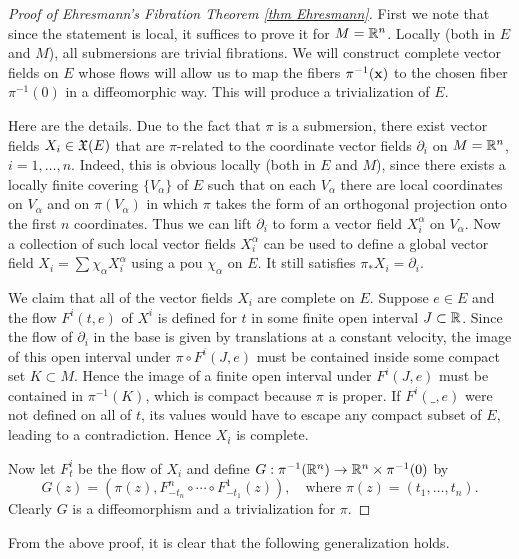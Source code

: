 \begin{proof}[Proof of Ehresmann's Fibration Theorem \ref{thm Ehresmann}]\label{proof of Ehresmann thm}
    First we note that since the statement is local, it suffices to prove it for $M=\bbR^n$. Locally (both in $E$ and $M$), all submersions are trivial fibrations. We will construct complete vector fields on $E$ whose flows will allow us to map the fibers $\pi^{-1}(\bf{x})$ to the chosen fiber $\pi^{-1}(0)$ in a diffeomorphic way. This will produce a  trivialization of $E$.
    
    Here are the details. Due to the fact that $\pi$ is a submersion, there exist vector fields $X_i\in\fX(E)$ that are $\pi$-related to the coordinate vector fields $\partial_i$ on $M=\bbR^n$, $i=1,\ldots,n$. Indeed, this is obvious locally (both in $E$ and $M$), since there exists a locally finite covering $\{V_\alpha\}$ of $E$ such that on each $V_\alpha$ there are local coordinates on $V_\alpha$ and on $\pi(V_\alpha)$ in which $\pi$ takes the form of an orthogonal projection onto the first $n$ coordinates. Thus we can lift $\partial_i$ to form a vector field $X^\alpha_i$ on $V_\alpha$. Now a collection of such local vector fields $X_i^\alpha$ can be used to define a global vector field $X_i=\sum\chi_\alpha X_i^\alpha$ using a \gls{pou} $\chi_\alpha$ on $E$. It still satisfies $\pi_\ast X_i=\partial_i$.

    We claim that all of the vector fields $X_i$ are complete on $E$. Suppose $e\in E$ and the flow $F^i(t,e)$ of $X^i$ is defined for $t$ in some finite open interval $J\subset \bbR$. Since the flow of $\partial_i$ in the base is given by translations at a constant velocity, the image of this open interval under $\pi\circ F^i(J,e)$ must be contained inside some compact set $K\subset M$. Hence the image of a finite open interval under $F^i(J,e)$ must be contained in $\pi^{-1}(K)$, which is compact because $\pi$ is proper. If $F^i(\_,e)$ were not defined on all of $t$, its values would have to escape any compact subset of $E$, leading to a contradiction. Hence $X_i$ is complete.
    
    Now let $F^i_t$ be the flow of $X_i$ and define $G:\pi^{-1}(\bbR^n)\to \bbR^n\times \pi^{-1}(0)$ by 
    \[G(z)=\left(\pi(z),F^n_{-t_n}\circ \cdots\circ F^1_{-t_1}(z)\right),\quad \text{where }\pi(z)=(t_1,\ldots,t_n).\]
    Clearly $G$ is a diffeomorphism and a trivialization for $\pi$.
\end{proof}

From the above proof, it is clear that the following generalization holds.

